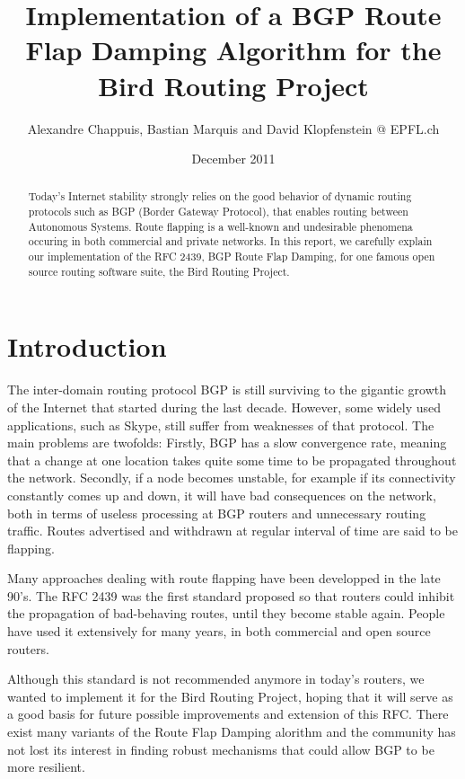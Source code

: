 \documentclass[a4paper,english]{IEEEtran}
\begin{document}
\date{December 2011}


\author{Alexandre Chappuis, Bastian Marquis and David Klopfenstein @ EPFL.ch}


\title{Implementation of a BGP Route Flap Damping Algorithm for the Bird
Routing Project}
\maketitle
\begin{abstract}

Today's Internet stability strongly relies on the good behavior of
dynamic routing protocols such as BGP (Border Gateway Protocol),
that enables routing between Autonomous Systems. Route flapping is
a well-known and undesirable phenomena occuring in both commercial
and private networks. In this report, we carefully explain our implementation
of the RFC 2439, BGP Route Flap Damping, for one famous open source
routing software suite, the Bird Routing Project.

\end{abstract}

\section{Introduction}

The inter-domain routing protocol BGP is still surviving to the gigantic
growth of the Internet that started during the last decade.
However, some widely used applications, such as Skype, still suffer from weaknesses
of that protocol.
The main problems are twofolds:
Firstly, BGP has a slow convergence rate, meaning that a change
at one location takes quite some time to be propagated throughout
the network. Secondly, if a node becomes unstable, for example if
its connectivity constantly comes up and down, it will have bad consequences
on the network, both in terms of useless processing at BGP routers and
unnecessary routing traffic. Routes advertised and withdrawn
at regular interval of time are said to be flapping.

Many approaches dealing with route flapping have been developped in the late 90's.
The RFC 2439\cite{rfc2439} was the first standard
proposed so that routers could inhibit the propagation of bad-behaving
routes, until they become stable again. People have used it extensively
for many years, in both commercial and open source routers.

Although this standard is not recommended anymore\cite{ripe recommendations}
in today's routers, we wanted to implement it for the Bird Routing
Project\cite{bird}, hoping that it will serve as a good basis for
future possible improvements and extension of this RFC. There exist
many variants of the Route Flap Damping alorithm and the community
has not lost its interest in finding robust mechanisms that could
allow BGP to be more resilient. 
\end{document}

